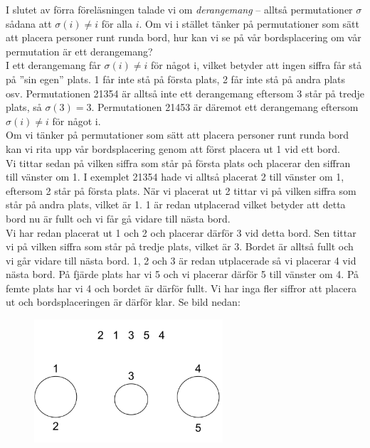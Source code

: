 \documentclass[nobib]{tufte-handout}
\begin{document}
\newpage
\begin{xca2}
  I slutet av förra föreläsningen talade vi om \emph{derangemang} -- alltså permutationer $\sigma$ sådana att $\sigma(i) \neq i$ för alla $i$. Om vi i stället tänker på permutationer som sätt att placera personer runt runda bord, hur kan vi se på vår bordsplacering om vår permutation är ett derangemang?
\\ \bigskip
I ett derangemang får $\sigma(i) \neq i$ för något i, vilket betyder att ingen siffra får stå på ”sin egen” plats. 1 får inte stå på första plats, 2 får inte stå på andra plats osv. Permutationen 21354 är alltså inte ett derangemang eftersom 3 står på tredje plats, så $\sigma(3) = 3$. Permutationen 21453 är däremot ett derangemang eftersom $\sigma(i) \neq i$ för något i.\\
Om vi tänker på permutationer som sätt att placera personer runt runda bord kan vi rita upp vår bordsplacering genom att först placera ut 1 vid ett bord. \\
Vi tittar sedan på vilken siffra som står på första plats och placerar den siffran till vänster om 1. I exemplet 21354 hade vi alltså placerat 2 till vänster om 1, eftersom 2 står på första plats. När vi placerat ut 2 tittar vi på vilken siffra som står på andra plats, vilket är 1. 1 är redan utplacerad vilket betyder att detta bord nu är fullt och vi får gå vidare till nästa bord.\\
Vi har redan placerat ut 1 och 2 och placerar därför 3 vid detta bord. Sen tittar vi på vilken siffra som står på tredje plats, vilket är 3. Bordet är alltså fullt och vi går vidare till nästa bord. 1, 2 och 3 är redan utplacerade så vi placerar 4 vid nästa bord. På fjärde plats har vi 5 och vi placerar därför 5 till vänster om 4. På femte plats har vi 4 och bordet är därför fullt.  Vi har inga fler siffror att placera ut och bordsplaceringen är därför klar. Se bild nedan: \\
\begin{figure}[h]
\includegraphics[width=70mm]{ovning_4.1.png}

\end{figure}
\end{xca2}
\end{document}
